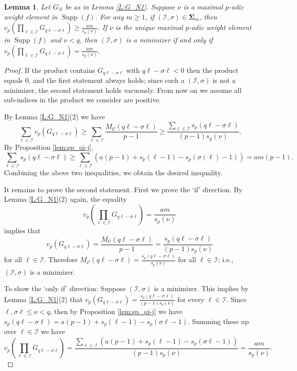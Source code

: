 \documentclass{amsart}
\numberwithin{equation}{section}
\newcommand{\bSig}{\mathbf\Sigma}
\newcommand{\cC}{\mathcal{C}}
\newcommand{\cI}{\mathcal{I}}
\DeclareMathOperator{\Supp}{Supp}
\theoremstyle{plain}
\newtheorem{lemma}[theorem]{Lemma}
\theoremstyle{definition}
\begin{document}
\begin{lemma}
\label{L:G_N}
Let $G_N$ be as in Lemma \ref{L:G_N1}.
Suppose $\nu$ is a maximal $p$-adic weight element in $\Supp(f)$.
For any $m\ge 1$, if $(\cI,\sigma)\in \bSig_m$, then  
    $
        v_p\left(\prod_{\ell\in \cI} G_{q\ell - \sigma \ell}
            \right) \ge \frac{am}{s_p(\nu)}.
    $
If $\nu$ is the unique maximal $p$-adic weight element in $\Supp(f)$ and
$\nu<q$, then 
$(\cI,\sigma)$ is a minimizer if and only if  
$v_p\left(\prod_{\ell\in \cI} G_{q\ell - \sigma \ell}
            \right) = \frac{am}{s_p(\nu)}$.
\end{lemma}

\begin{proof}
If the product contains $G_{q\ell-\sigma \ell}$ with $q\ell-\sigma\ell<0$
then the product equals $0$, and the first statement always holds; 
since such a $(\cI,\sigma)$ is not a minimizer, the second statement holds vacuously. 
From now on we assume all sub-indices in the product we consider 
are positive.

By Lemma \ref{L:G_N1}(2) we have 
   \begin{equation*}
        \sum_{\ell\in \cI} v_p(G_{q\ell- \sigma \ell}) 
                \ge \sum_{\ell\in \cI} \frac{M_\cC(q\ell - \sigma \ell)}{p-1} 
                \ge 
                \frac{\sum_{\ell\in \cI} s_p(q\ell - \sigma \ell)}{(p-1)s_p(\nu)}.
    \end{equation*}
By Proposition \ref{lem:sp_qi-j}, 
\begin{equation*}
\sum_{\ell\in \cI} s_p(q\ell - \sigma \ell)
\ge 
\sum_{\ell\in \cI} (a(p-1)+s_p(\ell -1 ) -s_p(\sigma(\ell)-1))  
=am(p-1).
\end{equation*}
Combining the above two inequalities, we obtain the desired inequality.

It remains to prove the second statement.
First we prove the `if' direction.
By Lemma \ref{L:G_N1}(2) again, 
the equality 
$$
v_p(\prod_{\ell\in \cI}G_{q\ell-\sigma\ell})=\frac{am}{s_p(\nu)}
$$
implies that
\[
    v_p(G_{q\ell - \sigma\ell})=
    \frac{M_\cC(q\ell - \sigma\ell)}{p-1}
    =
    \frac{s_p(q\ell-\sigma\ell)}{(p-1)s_p(\nu)}
\]
for all $\ell\in \cI$.
Therefore
$M_\cC(q\ell - \sigma \ell) = \frac{s_p(q\ell - \sigma \ell)}{s_p(\nu)}$
for all $\ell \in \cI$; i.e., $(\cI,\sigma)$ is a minimizer.

To show the `only if' direction:
Suppose $(\cI,\sigma)$ is a minimizer. This implies by Lemma \ref{L:G_N1}(2)
that $v_p(G_{q\ell-\sigma\ell})=\frac{s_p(q\ell-\sigma\ell)}{(p-1)s_p(\nu)}$ 
for every $\ell\in \cI$. Since  $\ell,\sigma\ell\le \nu<q$, then by Proposition \ref{lem:sp_qi-j}
we have $s_p(q\ell-\sigma\ell)
=a(p-1)+s_p(\ell-1)-s_p(\sigma\ell-1)$.
Summing these up over $\ell\in \cI$
we have
\[
    v_p\left(\prod_{\ell\in \cI}G_{q\ell-\sigma\ell}\right)
    =\frac{\sum_{\ell\in \cI}(a(p-1)+s_p(\ell-1)-s_p(\sigma\ell-1))}
    {(p-1)s_p(\nu)}=\frac{am}{s_p(\nu)}.
\]
\end{proof}
\end{document}
